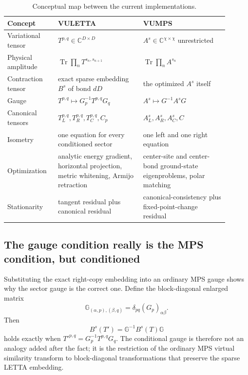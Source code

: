 \documentclass[11pt]{article}
\newcommand{\CC}{\mathbb{C}}
\newcommand{\Tr}{\operatorname{Tr}}
\begin{document}
\begin{table}[htbp]
  \centering
  \caption{Conceptual map between the current implementations.}
  \label{tab:method-map}
  \small
  \begin{tabular}{@{}p{0.20\linewidth}p{0.35\linewidth}p{0.35\linewidth}@{}}
    \toprule
    Concept & VULETTA & VUMPS \\
    \midrule
    Variational tensor
      & $T^{p,q}\in\CC^{D\times D}$
      & $A^s\in\CC^{\chi\times\chi}$ unrestricted \\
    Physical amplitude
      & $\Tr\prod_n T^{s_n,s_{n+1}}$
      & $\Tr\prod_n A^{s_n}$ \\
    Contraction tensor
      & exact sparse embedding $B^s$ of bond $dD$
      & the optimized $A^s$ itself \\
    Gauge
      & $T^{p,q}\mapsto G_p^{-1}T^{p,q}G_q$
      & $A^s\mapsto G^{-1}A^sG$ \\
    Canonical tensors
      & $T_L^{p,q},T_R^{p,q},T_C^{p,q},C_p$
      & $A_L^s,A_R^s,A_C^s,C$ \\
    Isometry
      & one equation for every conditioned sector
      & one left and one right equation \\
    Optimization
      & analytic energy gradient, horizontal projection, metric whitening,
        Armijo retraction
      & center-site and center-bond ground-state eigenproblems, polar matching \\
    Stationarity
      & tangent residual plus canonical residual
      & canonical-consistency plus fixed-point-change residual \\
    \bottomrule
  \end{tabular}
\end{table}

\subsection{The gauge condition really is the MPS condition, but conditioned}

Substituting the exact right-copy embedding into an ordinary MPS gauge shows
why the sector gauge is the correct one.  Define the block-diagonal enlarged
matrix
\begin{equation}
  \mathbb G_{(\alpha,p),(\beta,q)}
  =
  \delta_{pq}(G_p)_{\alpha\beta}.
  \label{eq:enlarged-block-gauge}
\end{equation}
Then
\begin{equation}
  B^s(T')=\mathbb G^{-1}B^s(T)\mathbb G
  \label{eq:embedding-gauge-equivariance}
\end{equation}
holds exactly when $T'^{p,q}=G_p^{-1}T^{p,q}G_q$.  The conditional gauge is
therefore not an analogy added after the fact; it is the restriction of the
ordinary MPS virtual similarity transform to block-diagonal transformations
that preserve the sparse LETTA embedding.
\end{document}
